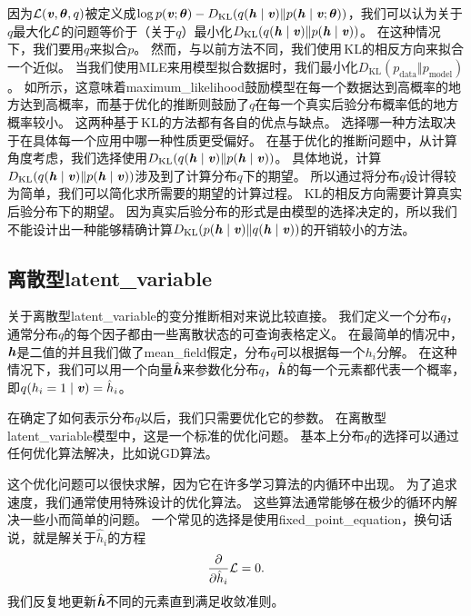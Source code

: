 因为$\mathcal{L}(\boldsymbol{\mathit{v}},\boldsymbol{\theta},q)$被定义成$\log p(\boldsymbol{\mathit{v}};\boldsymbol{\theta}) - D_{\text{KL}} (q(\boldsymbol{\mathit{h}}\mid\boldsymbol{\mathit{v}}) \Vert  p(\boldsymbol{\mathit{h}}\mid\boldsymbol{\mathit{v}};\boldsymbol{\theta}) )$，我们可以认为关于$q$最大化$\mathcal{L}$的问题等价于（关于$q$）最小化$D_{\text{KL}}(q(\boldsymbol{\mathit{h}}\mid\boldsymbol{\mathit{v}})\Vert p(\boldsymbol{\mathit{h}}\mid\boldsymbol{\mathit{v}}))$。
在这种情况下，我们要用$q$来拟合$p$。
然而，与以前方法不同，我们使用\,\gls{KL}的相反方向来拟合一个近似。
当我们使用\gls{MLE}来用模型拟合数据时，我们最小化$D_{\text{KL}}(p_{\text{data}} \Vert p_{\text{model}})$。
如所示，这意味着\gls{maximum_likelihood}鼓励模型在每一个数据达到高概率的地方达到高概率，而基于优化的推断则鼓励了$q$在每一个真实后验分布概率低的地方概率较小。
这两种基于\,\gls{KL}的方法都有各自的优点与缺点。
选择哪一种方法取决于在具体每一个应用中哪一种性质更受偏好。
在基于优化的推断问题中，从计算角度考虑，我们选择使用$D_{\text{KL}}(q(\boldsymbol{\mathit{h}}\mid\boldsymbol{\mathit{v}})\Vert p(\boldsymbol{\mathit{h}}\mid\boldsymbol{\mathit{v}}))$。
具体地说，计算$D_{\text{KL}}(q(\boldsymbol{\mathit{h}}\mid\boldsymbol{\mathit{v}})\Vert p(\boldsymbol{\mathit{h}}\mid\boldsymbol{\mathit{v}}))$涉及到了计算分布$q$下的期望。
所以通过将分布$q$设计得较为简单，我们可以简化求所需要的期望的计算过程。
\gls{KL}的相反方向需要计算真实后验分布下的期望。
因为真实后验分布的形式是由模型的选择决定的，所以我们不能设计出一种能够精确计算$D_{\text{KL}}(p(\boldsymbol{\mathit{h}}\mid\boldsymbol{\mathit{v}}) \Vert q(\boldsymbol{\mathit{h}}\mid\boldsymbol{\mathit{v}}))$的开销较小的方法。




\subsection{离散型\gls{latent_variable}}
\label{sec:discrete_latent_variables}

关于离散型\gls{latent_variable}的变分推断相对来说比较直接。
我们定义一个分布$q$，通常分布$q$的每个因子都由一些离散状态的可查询表格定义。
在最简单的情况中，$\boldsymbol{\mathit{h}}$是二值的并且我们做了\gls{mean_field}假定，分布$q$可以根据每一个$h_i$分解。
在这种情况下，我们可以用一个向量$\hat{\boldsymbol{\mathit{h}}}$来参数化分布$q$，$\hat{\boldsymbol{\mathit{h}}}$的每一个元素都代表一个概率，即$q(h_i = 1\mid \boldsymbol{\mathit{v}}) = \hat{h}_i$。


在确定了如何表示分布$q$以后，我们只需要优化它的参数。
在离散型\gls{latent_variable}模型中，这是一个标准的优化问题。
基本上分布$q$的选择可以通过任何优化算法解决，比如说\gls{GD}算法。


这个优化问题可以很快求解，因为它在许多学习算法的内循环中出现。
为了追求速度，我们通常使用特殊设计的优化算法。
这些算法通常能够在极少的循环内解决一些小而简单的问题。
一个常见的选择是使用\gls{fixed_point_equation}，换句话说，就是解关于$\hat{h}_i$的方程
\begin{align}
	\frac{\partial}{\partial \hat{h}_i}\mathcal{L} = 0.
\end{align}
我们反复地更新$\hat{\boldsymbol{\mathit{h}}}$不同的元素直到满足收敛准则。


